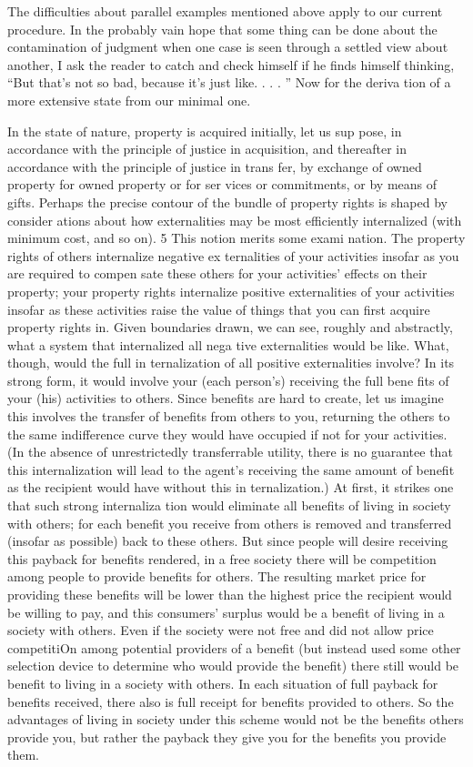 \documentclass[11pt,openany]{book}
\begin{document}
The difficulties about parallel examples mentioned above apply to our current procedure. In the probably vain hope that some thing can be done about the contamination of judgment when one case is seen through a settled view about another, I ask the reader to catch and check himself if he finds himself thinking, ``But that's not so bad, because it's just like. . . . '' Now for the deriva tion of a more extensive state from our minimal one. 

In the state of nature, property is acquired initially, let us sup pose, in accordance with the principle of justice in acquisition, and thereafter in accordance with the principle of justice in trans fer, by exchange of owned property for owned property or for ser vices or commitments, or by means of gifts. Perhaps the precise contour of the bundle of property rights is shaped by consider ations about how externalities may be most efficiently internalized (with minimum cost, and so on). 5 This notion merits some exami nation. The property rights of others internalize negative ex ternalities of your activities insofar as you are required to compen sate these others for your activities' effects on their property; your property rights internalize positive externalities of your activities insofar as these activities raise the value of things that you can first acquire property rights in. Given boundaries drawn, we can see, roughly and abstractly, what a system that internalized all nega tive externalities would be like. What, though, would the full in ternalization of all positive externalities involve? In its strong form, it would involve your (each person's) receiving the full bene fits of your (his) activities to others. Since benefits are hard to create, let us imagine this involves the transfer of benefits from others to you, returning the others to the same indifference curve they would have occupied if not for your activities. (In the absence of unrestrictedly transferrable utility, there is no guarantee that this internalization will lead to the agent's receiving the same amount of benefit as the recipient would have without this in ternalization.) At first, it strikes one that such strong internaliza tion would eliminate all benefits of living in society with others; for each benefit you receive from others is removed and transferred (insofar as possible) back to these others. But since people will desire receiving this payback for benefits rendered, in a free society there will be competition among people to provide benefits for others. The resulting market price for providing these benefits will be lower than the highest price the recipient would be willing to pay, and this consumers' surplus would be a benefit of living in a society with others. Even if the society were not free and did not allow price competitiOn among potential providers of a benefit (but instead used some other selection device to determine who would provide the benefit) there still would be benefit to living in a society with others. In each situation of full payback for benefits received, there also is full receipt for benefits provided to others. So the advantages of living in society under this scheme would not be the benefits others provide you, but rather the payback they give you for the benefits you provide them. 
\end{document}
